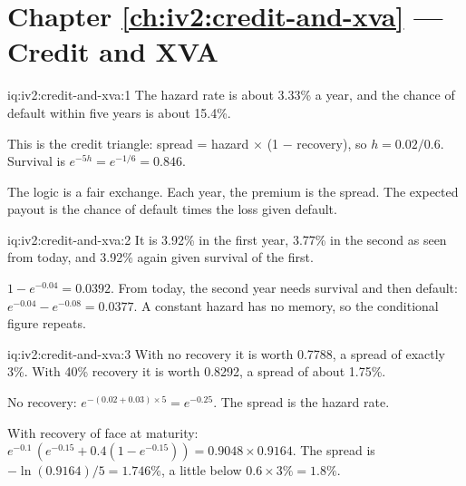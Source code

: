 \section*{Chapter \ref{ch:iv2:credit-and-xva} --- Credit and XVA}

\begin{solution}{iq:iv2:credit-and-xva:1}
The hazard rate is about 3.33\% a year, and the chance of default within five years is about 15.4\%.

This is the credit triangle: spread = hazard $\times$ (1 $-$ recovery), so $h = 0.02/0.6$. Survival is $e^{-5h} = e^{-1/6} = 0.846$.

The logic is a fair exchange. Each year, the premium is the spread. The expected payout is the chance of default times the loss given default.

\end{solution}

\begin{solution}{iq:iv2:credit-and-xva:2}
It is 3.92\% in the first year, 3.77\% in the second as seen from today, and 3.92\% again given survival of the first.

$1 - e^{-0.04} = 0.0392$. From today, the second year needs survival and then default: $e^{-0.04} - e^{-0.08} = 0.0377$. A constant hazard has no memory, so the conditional figure repeats.

\end{solution}

\begin{solution}{iq:iv2:credit-and-xva:3}
With no recovery it is worth 0.7788, a spread of exactly 3\%. With 40\% recovery it is worth 0.8292, a spread of about 1.75\%.

No recovery: $e^{-(0.02 + 0.03) \times 5} = e^{-0.25}$. The spread is the hazard rate.

With recovery of face at maturity: $e^{-0.1}\,(e^{-0.15} + 0.4(1 - e^{-0.15})) = 0.9048 \times 0.9164$. The spread is $-\ln(0.9164)/5 = 1.746\%$, a little below $0.6 \times 3\% = 1.8\%$.

\end{solution}

